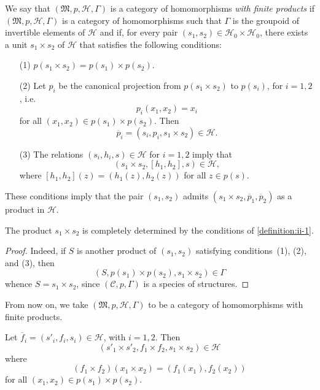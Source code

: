 \documentclass[a4paper,fleqn]{article}
\theoremstyle{plain}
\newenvironment{proposition}[1]
  {\renewcommand\theinnerproposition{#1}\innerproposition}
  {\endinnerproposition}
\theoremstyle{definition}
\newenvironment{definition}[1]
  {\renewcommand\theinnerdefinition{#1}\innerdefinition}
  {\endinnerdefinition}
\newcommand{\oldpage}[1]{{\marginpar{\footnotesize$\bigg\vert$\,\,\,\,\textit{p.~#1}}}}
\newcommand{\CC}{\mathcal{C}}
\newcommand{\HH}{\mathcal{H}}
\newcommand{\MM}{\mathfrak{M}}
\begin{document}
\begin{definition}{1}
\label{definition:ii-1}
  We say that $(\MM,p,\HH,\Gamma)$ is a category of homomorphisms \emph{with finite products} if $(\MM,p,\HH,\Gamma)$ is a category of homomorphisms such that $\Gamma$ is the groupoid of invertible elements of $\HH$ and if, for every pair $(s_1,s_2)\in\HH_0\times\HH_0$, there exists a unit $s_1\times s_2$ of $\HH$ that satisfies the following conditions:

  \begin{enumerate}
    \item[\normalfont(1)]
      $p(s_1\times s_2)=p(s_1)\times p(s_2)$.

    \item[\normalfont(2)]
      Let $p_i$ be the canonical projection from $p(s_1\times s_2)$ to $p(s_i)$, for $i=1,2$, i.e.
      \[
        p_i(x_1,x_2) = x_i
      \]
      for all $(x_1,x_2)\in p(s_1)\times p(s_2)$.
      Then
      \[
        \overline{p}_i
        = (s_i,p_i,s_1\times s_2)
        \in\HH.
      \]

    \item[\normalfont(3)]
      The relations $(s_i,h_i,s)\in\HH$ for $i=1,2$ imply that
      \[
        (s_1\times s_2,[h_1,h_2],s)
        \in\HH,
      \]
      where $[h_1,h_2](z)=(h_1(z),h_2(z))$ for all $z\in p(s)$.
  \end{enumerate}
\end{definition}

These conditions imply that the pair $(s_1,s_2)$ admits $(s_1\times s_2,\overline{p}_1,\overline{p}_2)$ as a product \cite{4} in $\HH$.

\begin{proposition}{1}
\label{proposition:ii-1}
  The product $s_1\times s_2$ is completely determined by the conditions of \cref{definition:ii-1}.
\end{proposition}

\begin{proof}
  Indeed, if $S$ is another product of $(s_1,s_2)$ satisfying conditions~(1), (2), and (3), then
  \[
    (S,p(s_1)\times p(s_2),s_1\times s_2)
    \in\Gamma
  \]
  whence $S=s_1\times s_2$, since $(\CC,p,\Gamma)$ is a species of structures.
\end{proof}

From now on, we take $(\MM,p,\HH,\Gamma)$ to be a category of homomorphisms with finite products.

\begin{proposition}{2}
\label{proposition:ii-2}
  Let $\overline{f}_i=(s'_i,f_i,s_i)\in\HH$, with $i=1,2$.
  Then
  \[
    (s'_1\times s'_2, f_1\times f_2, s_1\times s_2)
    \in\HH
  \]
  \oldpage{382}
  where
  \[
    (f_1\times f_2)(x_1\times x_2)
    = (f_1(x_1),f_2(x_2))
  \]
  for all $(x_1,x_2)\in p(s_1)\times p(s_2)$.
\end{proposition}
\end{document}

